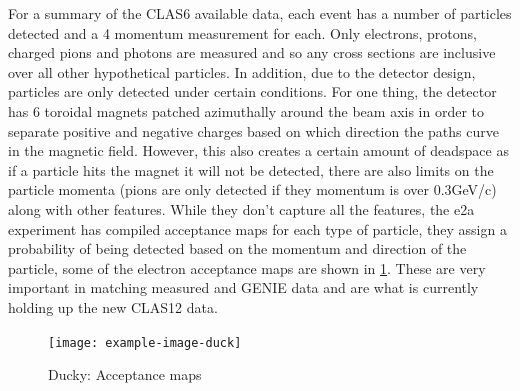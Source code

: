 \documentclass[a4paper,12pt]{article}
\begin{document}
For a summary of the CLAS6 available data, each event has a number of particles detected and a 4 momentum measurement for each.
Only electrons, protons, charged pions and photons are measured and so any cross sections are inclusive over all other hypothetical particles.
In addition, due to the detector design, particles are only detected under certain conditions.
For one thing, the detector has 6 toroidal magnets patched azimuthally around the beam axis in order to separate positive and negative charges based on which direction the paths curve in the magnetic field.
However, this also creates a certain amount of deadspace as if a particle hits the magnet it will not be detected, there are also limits on the particle momenta (pions are only detected if they momentum is over 0.3\si{GeV/c}) along with other features.
While they don't capture all the features, the e2a experiment has compiled acceptance maps for each type of particle, they assign a probability of being detected based on the momentum and direction of the particle, some of the electron acceptance maps are shown in \cref{fig:acc_map}.
These are very important in matching measured and GENIE data and are what is currently holding up the new CLAS12 data.

\begin{figure}[h]
\centering
    \texttt{[image: example-image-duck]}
    \caption{
        Ducky: Acceptance maps
    }\label{fig:acc_map}
\end{figure}



\newpage


\printbibliography
\end{document}
